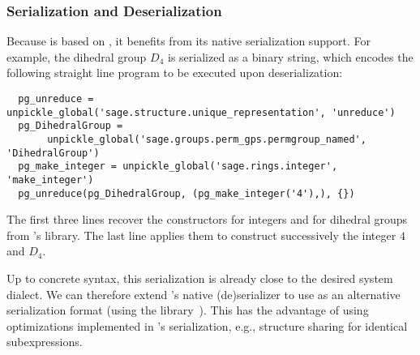 
\subsubsection{Serialization and Deserialization}

Because \Sage is based on \Python, it benefits from its native serialization support.
For example, the dihedral group $D_4$ is serialized as a binary string, which encodes the following straight line program to be executed upon deserialization:
\begin{lstlisting}
  pg_unreduce = unpickle_global('sage.structure.unique_representation', 'unreduce')
  pg_DihedralGroup = 
       unpickle_global('sage.groups.perm_gps.permgroup_named', 'DihedralGroup')
  pg_make_integer = unpickle_global('sage.rings.integer', 'make_integer')
  pg_unreduce(pg_DihedralGroup, (pg_make_integer('4'),), {})
\end{lstlisting}
The first three lines recover the constructors for integers and for dihedral groups from \Sage's library.
The last line applies them to construct successively the integer $4$ and $D_4$.

Up to concrete syntax, this serialization is already close to the desired \Sage system dialect.
We can therefore extend \Python's native (de)serializer to use \OMMT as an alternative serialization format (using the \Python library~\cite{py-openmath:on}).
This has the advantage of using optimizations implemented in \Python's serialization, e.g., structure sharing for identical subexpressions.

